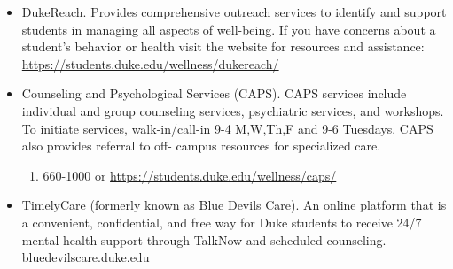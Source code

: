 \documentclass[
  12pt,
  letterpaper,
  DIV=11,
  numbers=noendperiod]{scrartcl}
\providecommand{\tightlist}{%
  \setlength{\itemsep}{0pt}\setlength{\parskip}{0pt}}\usepackage{longtable,booktabs,array}
\begin{document}
\begin{itemize}
\item
  DukeReach. Provides comprehensive outreach services to identify and
  support students in managing all aspects of well-being. If you have
  concerns about a student's behavior or health visit the website for
  resources and assistance:
  \url{https://students.duke.edu/wellness/dukereach/}
\item
  Counseling and Psychological Services (CAPS). CAPS services include
  individual and group counseling services, psychiatric services, and
  workshops. To initiate services, walk-in/call-in 9-4 M,W,Th,F and 9-6
  Tuesdays. CAPS also provides referral to off- campus resources for
  specialized care.

  \begin{enumerate}
  \def\labelenumi{(\arabic{enumi})}
  \setcounter{enumi}{918}
  \tightlist
  \item
    660-1000 or \url{https://students.duke.edu/wellness/caps/}
  \end{enumerate}
\item
  TimelyCare (formerly known as Blue Devils Care). An online platform
  that is a convenient, confidential, and free way for Duke students to
  receive 24/7 mental health support through TalkNow and scheduled
  counseling. bluedevilscare.duke.edu
\end{itemize}
\end{document}
